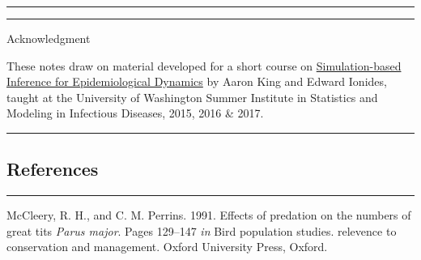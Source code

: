 \documentclass[]{article}
\begin{document}
\begin{center}\rule{0.5\linewidth}{\linethickness}\end{center}

\begin{center}\rule{0.5\linewidth}{\linethickness}\end{center}

Acknowledgment

These notes draw on material developed for a short course on
\href{http://kingaa.github.io/sbied/}{Simulation-based Inference for
Epidemiological Dynamics} by Aaron King and Edward Ionides, taught at
the University of Washington Summer Institute in Statistics and Modeling
in Infectious Diseases, 2015, 2016 \& 2017.

\begin{center}\rule{0.5\linewidth}{\linethickness}\end{center}

\subsection{References}\label{references}

\begin{center}\rule{0.5\linewidth}{\linethickness}\end{center}

\hypertarget{refs}{}
\hypertarget{ref-mccleery91}{}
McCleery, R. H., and C. M. Perrins. 1991. Effects of predation on the
numbers of great tits \emph{Parus major}. Pages 129--147 \emph{in} Bird
population studies. relevence to conservation and management. Oxford
University Press, Oxford.
\end{document}
